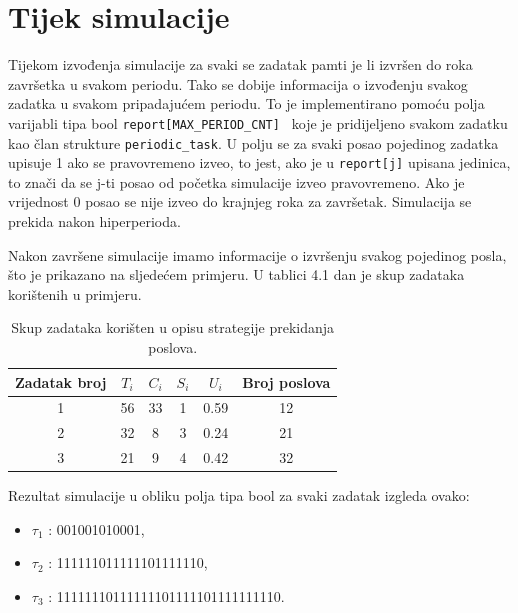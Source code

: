 \documentclass[../zavrsni.tex]{subfiles}
\begin{document}
\section{Tijek simulacije}

Tijekom izvođenja simulacije za svaki se zadatak pamti je li izvršen do roka završetka u svakom periodu. 
Tako se dobije informacija o izvođenju svakog zadatka u svakom pripadajućem periodu. To je implementirano 
pomoću polja varijabli tipa bool \texttt{report[MAX\_PERIOD\_CNT] } koje je pridijeljeno svakom zadatku kao član strukture \texttt{periodic\_task}.
U polju se za svaki posao pojedinog zadatka upisuje 1 ako se pravovremeno izveo, to jest, ako je u \texttt{report[j]} upisana jedinica, to znači da se 
j-ti posao od početka simulacije izveo pravovremeno. Ako je vrijednost 0 posao se nije izveo do krajnjeg roka za završetak.
Simulacija se prekida nakon hiperperioda.

Nakon završene simulacije imamo informacije o izvršenju svakog pojedinog posla, što je prikazano na sljedećem primjeru. U tablici 4.1 dan je 
skup zadataka korištenih u primjeru.

\begin{table}[h!]
    \begin{center}
      \begin{tabular}{||c || c c c c c||} 
       \hline
       Zadatak broj & $T_i$ & $C_i$ & $S_i$ & $U_i$ & Broj poslova \\ [0.5ex] 
       \hline\hline
       1 & 56 & 33 & 1 & 0.59 & 12 \\ 
       \hline
       2 & 32 & 8 & 3 & 0.24 & 21 \\
       \hline
       3 & 21 & 9 & 4 & 0.42 & 32 \\
       \hline
      \end{tabular}
    \end{center}
    \caption{\label{tab:table-name}Skup zadataka korišten u opisu strategije prekidanja poslova.}
    \end{table}

Rezultat simulacije u obliku polja tipa bool za svaki zadatak izgleda ovako:

\begin{itemize}
        \item[] $\tau_1$ : 001001010001,
        \item[] $\tau_2$ : 111111011111101111110,
        \item[] $\tau_3$ : 11111110111111101111101111111110.
\end{itemize}
\end{document}
